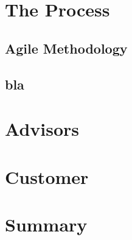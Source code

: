 \section{The Process}
\subsection{Agile Methodology}

\subsection{bla}


\section{Advisors}

\section{Customer}

\section{Summary}


